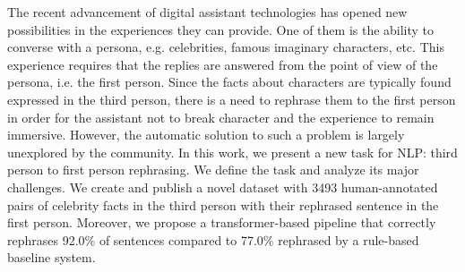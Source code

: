 The recent advancement of digital assistant technologies has opened new possibilities in the experiences they can provide. One of them is the ability to converse with a  persona, e.g. celebrities, famous imaginary characters, etc. This experience requires that the replies are answered from the point of view of the persona, i.e. the first person. Since the facts about characters are typically found expressed in the third person, there is a need to rephrase them to the first person in order for the assistant not to break character and the experience to remain immersive. However, the automatic solution to such a problem is largely unexplored by the community. In this work, we present a new task for NLP: third person to first person rephrasing. We define the task and analyze its major challenges. We create and publish a novel dataset with 3493 human-annotated pairs of celebrity facts in the third person with their rephrased sentence in the first person. Moreover, we propose a transformer-based pipeline that correctly rephrases 92.0\% of sentences compared to 77.0\% rephrased by a rule-based baseline system.
